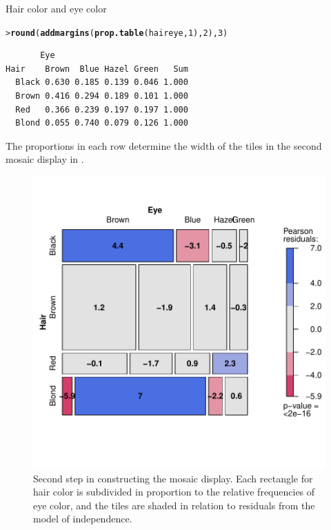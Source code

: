 \documentclass[10pt,krantz2]{krantz}\usepackage[]{graphicx}\usepackage[]{color}
\makeatletter
\newcommand{\hlnum}[1]{\textcolor[rgb]{0.686,0.059,0.569}{#1}}%
\newcommand{\hlstd}[1]{\textcolor[rgb]{0.345,0.345,0.345}{#1}}%
\newcommand{\hlkwd}[1]{\textcolor[rgb]{0.737,0.353,0.396}{\textbf{#1}}}%
\newenvironment{kframe}{%
 \def\at@end@of@kframe{}%
 \ifinner\ifhmode%
  \def\at@end@of@kframe{\end{minipage}}%
  \begin{minipage}{\columnwidth}%
 \fi\fi%
 \def\FrameCommand##1{\hskip\@totalleftmargin \hskip-\fboxsep
 \colorbox{shadecolor}{##1}\hskip-\fboxsep
     \hskip-\linewidth \hskip-\@totalleftmargin \hskip\columnwidth}%
 \MakeFramed {\advance\hsize-\width
   \@totalleftmargin\z@ \linewidth\hsize
   \@setminipage}}%
 {\par\unskip\endMakeFramed%
 \at@end@of@kframe}
\newenvironment{knitrout}{}{} %
\renewenvironment{knitrout}{\small\renewcommand{\baselinestretch}{.85}}{} %
\makeatother
\begin{document}
\begin{Example}[haireye2a]{Hair color and eye color}
\begin{knitrout}
\color{fgcolor}\begin{kframe}
\begin{alltt}
\hlstd{> }\hlkwd{round}\hlstd{(}\hlkwd{addmargins}\hlstd{(}\hlkwd{prop.table}\hlstd{(haireye,} \hlnum{1}\hlstd{),} \hlnum{2}\hlstd{),} \hlnum{3}\hlstd{)}
\end{alltt}
\begin{verbatim}
       Eye
Hair    Brown  Blue Hazel Green   Sum
  Black 0.630 0.185 0.139 0.046 1.000
  Brown 0.416 0.294 0.189 0.101 1.000
  Red   0.366 0.239 0.197 0.197 1.000
  Blond 0.055 0.740 0.079 0.126 1.000
\end{verbatim}
\end{kframe}
\end{knitrout}
The proportions in each row determine the width of the tiles in the second mosaic display in .

\begin{knitrout}
\color{fgcolor}\begin{figure}[!htbp]

\centerline{\includegraphics[width=.6\textwidth]{ch05/fig/haireye-mos8-1} }

\caption[Second step in constructing the mosaic display]{Second step in constructing the mosaic display.  Each rectangle for hair color is subdivided in proportion to the relative frequencies of eye color, and the tiles are shaded in relation to residuals from the model of independence.}\label{fig:haireye-mos8}
\end{figure}


\end{knitrout}


\end{Example}
\end{document}
